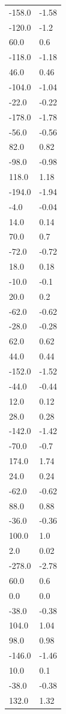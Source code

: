 \begin{longtable}{ll}
-158.0 & -1.58 \\
-120.0 & -1.2 \\
60.0 & 0.6 \\
-118.0 & -1.18 \\
46.0 & 0.46 \\
-104.0 & -1.04 \\
-22.0 & -0.22 \\
-178.0 & -1.78 \\
-56.0 & -0.56 \\
82.0 & 0.82 \\
-98.0 & -0.98 \\
118.0 & 1.18 \\
-194.0 & -1.94 \\
-4.0 & -0.04 \\
14.0 & 0.14 \\
70.0 & 0.7 \\
-72.0 & -0.72 \\
18.0 & 0.18 \\
-10.0 & -0.1 \\
20.0 & 0.2 \\
-62.0 & -0.62 \\
-28.0 & -0.28 \\
62.0 & 0.62 \\
44.0 & 0.44 \\
-152.0 & -1.52 \\
-44.0 & -0.44 \\
12.0 & 0.12 \\
28.0 & 0.28 \\
-142.0 & -1.42 \\
-70.0 & -0.7 \\
174.0 & 1.74 \\
24.0 & 0.24 \\
-62.0 & -0.62 \\
88.0 & 0.88 \\
-36.0 & -0.36 \\
100.0 & 1.0 \\
2.0 & 0.02 \\
-278.0 & -2.78 \\
60.0 & 0.6 \\
0.0 & 0.0 \\
-38.0 & -0.38 \\
104.0 & 1.04 \\
98.0 & 0.98 \\
-146.0 & -1.46 \\
10.0 & 0.1 \\
-38.0 & -0.38 \\
132.0 & 1.32 \\

\end{longtable}
